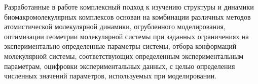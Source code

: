 {\methods}

Разработанные в работе комплексный подход к изучению структуры и динамики биомакромолекулярных комплексов основан на комбинации
различных методов атомистической молекулярной динамики, огрубленного моделирования, оптимизации геометрии молекулярной системы при заданных ограничениях на экспериментально определенные параметры системы, отбора конформаций молекулярной системы, соответствующих определенным экспериментальным параметрам, оцифровки экспериментальных данных, с целью определения численных значений параметров, используемых при моделировании.

